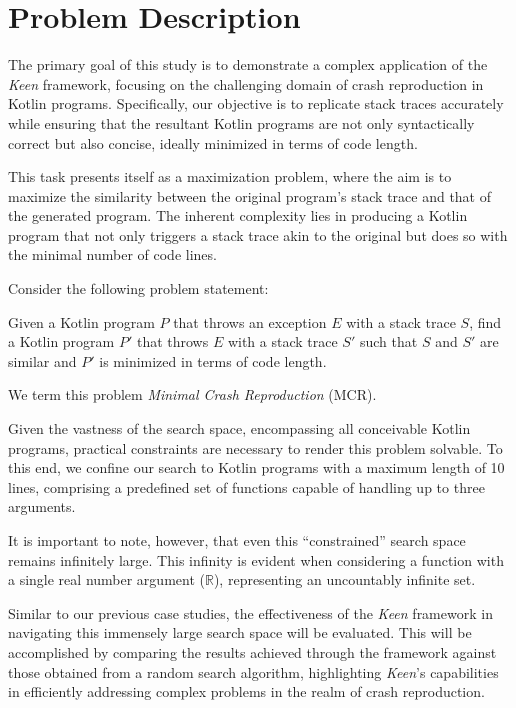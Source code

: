 \section{Problem Description}
\label{sec:beacon:problem}

    The primary goal of this study is to demonstrate a complex application of the \textit{Keen} framework, focusing on 
    the challenging domain of crash reproduction in Kotlin programs. Specifically, our objective is to replicate stack 
    traces accurately while ensuring that the resultant Kotlin programs are not only syntactically correct but also 
    concise, ideally minimized in terms of code length.

    This task presents itself as a maximization problem, where the aim is to maximize the similarity between the 
    original program's stack trace and that of the generated program. The inherent complexity lies in producing a Kotlin
    program that not only triggers a stack trace akin to the original but does so with the minimal number of code lines.

    Consider the following problem statement:

    \begin{displayquote}
        Given a Kotlin program \(P\) that throws an exception \(E\) with a stack trace \(S\), find a Kotlin program 
        \(P'\) that throws \(E\) with a stack trace \(S'\) such that \(S\) and \(S'\) are similar and \(P'\) is 
        minimized in terms of code length.
    \end{displayquote}

    We term this problem \textit{Minimal Crash Reproduction} (MCR).

    Given the vastness of the search space, encompassing all conceivable Kotlin programs, practical constraints are 
    necessary to render this problem solvable. To this end, we confine our search to Kotlin programs with a maximum 
    length of 10 lines, comprising a predefined set of functions capable of handling up to three arguments.

    It is important to note, however, that even this \enquote{constrained} search space remains infinitely large. This 
    infinity is evident when considering a function with a single real number argument (\(\mathbb{R}\)), representing 
    an uncountably infinite set. 

    Similar to our previous case studies, the effectiveness of the \textit{Keen} framework in navigating this 
    immensely large search space will be evaluated. This will be accomplished by comparing the results achieved 
    through the framework against those obtained from a random search algorithm, highlighting \textit{Keen}'s 
    capabilities in efficiently addressing complex problems in the realm of crash reproduction.

